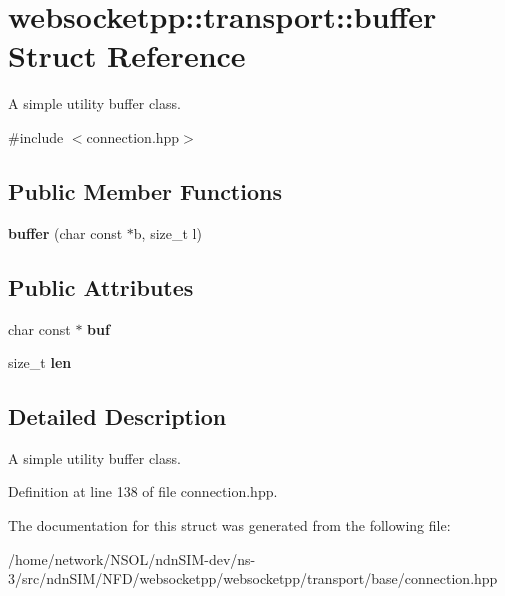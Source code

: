 \hypertarget{structwebsocketpp_1_1transport_1_1buffer}{}\section{websocketpp\+:\+:transport\+:\+:buffer Struct Reference}
\label{structwebsocketpp_1_1transport_1_1buffer}


A simple utility buffer class.  




{\ttfamily \#include $<$connection.\+hpp$>$}

\subsection*{Public Member Functions}
\begin{DoxyCompactItemize}
\item 
{\bfseries buffer} (char const $\ast$b, size\+\_\+t l)\hypertarget{structwebsocketpp_1_1transport_1_1buffer_a763623c638a41e3bb479b9b02c8437f2}{}\label{structwebsocketpp_1_1transport_1_1buffer_a763623c638a41e3bb479b9b02c8437f2}

\end{DoxyCompactItemize}
\subsection*{Public Attributes}
\begin{DoxyCompactItemize}
\item 
char const  $\ast$ {\bfseries buf}\hypertarget{structwebsocketpp_1_1transport_1_1buffer_a20572b592e33bf04ce5ffd7bced03c59}{}\label{structwebsocketpp_1_1transport_1_1buffer_a20572b592e33bf04ce5ffd7bced03c59}

\item 
size\+\_\+t {\bfseries len}\hypertarget{structwebsocketpp_1_1transport_1_1buffer_a89627b29fb3670a3a611ea2737d39821}{}\label{structwebsocketpp_1_1transport_1_1buffer_a89627b29fb3670a3a611ea2737d39821}

\end{DoxyCompactItemize}


\subsection{Detailed Description}
A simple utility buffer class. 

Definition at line 138 of file connection.\+hpp.



The documentation for this struct was generated from the following file\+:\begin{DoxyCompactItemize}
\item 
/home/network/\+N\+S\+O\+L/ndn\+S\+I\+M-\/dev/ns-\/3/src/ndn\+S\+I\+M/\+N\+F\+D/websocketpp/websocketpp/transport/base/connection.\+hpp\end{DoxyCompactItemize}
